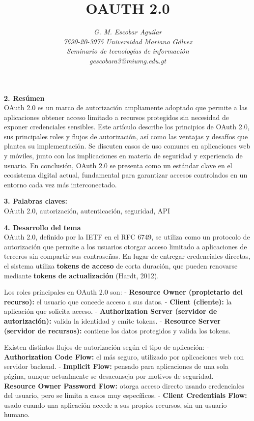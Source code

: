 \documentclass[12pt]{article}
\title{\textbf{\MakeUppercase{OAUTH 2.0}}}
\author{\textit{G. M. Escobar Aguilar}\\
\textit{7690-20-3975 Universidad Mariano Gálvez}\\
\textit{Seminario de tecnologías de información}\\
\textit{gescobara3@miumg.edu.gt}}
\date{}
\begin{document}
\maketitle

\textbf{2. Resúmen}  
\\
OAuth 2.0 es un marco de autorización ampliamente adoptado que permite a las aplicaciones obtener acceso limitado a recursos protegidos sin necesidad de exponer credenciales sensibles. Este artículo describe los principios de OAuth 2.0, sus principales roles y flujos de autorización, así como las ventajas y desafíos que plantea su implementación. Se discuten casos de uso comunes en aplicaciones web y móviles, junto con las implicaciones en materia de seguridad y experiencia de usuario. En conclusión, OAuth 2.0 se presenta como un estándar clave en el ecosistema digital actual, fundamental para garantizar accesos controlados en un entorno cada vez más interconectado.

\textbf{3. Palabras claves:}  
\\
OAuth 2.0, autorización, autenticación, seguridad, API

\textbf{4. Desarrollo del tema}  
\\
OAuth 2.0, definido por la IETF en el RFC 6749, se utiliza como un protocolo de autorización que permite a los usuarios otorgar acceso limitado a aplicaciones de terceros sin compartir sus contraseñas. En lugar de entregar credenciales directas, el sistema utiliza \textbf{tokens de acceso} de corta duración, que pueden renovarse mediante \textbf{tokens de actualización} (Hardt, 2012).  

Los roles principales en OAuth 2.0 son:  
- \textbf{Resource Owner (propietario del recurso):} el usuario que concede acceso a sus datos.  
- \textbf{Client (cliente):} la aplicación que solicita acceso.  
- \textbf{Authorization Server (servidor de autorización):} valida la identidad y emite tokens.  
- \textbf{Resource Server (servidor de recursos):} contiene los datos protegidos y valida los tokens.  

Existen distintos flujos de autorización según el tipo de aplicación:  
- \textbf{Authorization Code Flow:} el más seguro, utilizado por aplicaciones web con servidor backend.  
- \textbf{Implicit Flow:} pensado para aplicaciones de una sola página, aunque actualmente se desaconseja por motivos de seguridad.  
- \textbf{Resource Owner Password Flow:} otorga acceso directo usando credenciales del usuario, pero se limita a casos muy específicos.  
- \textbf{Client Credentials Flow:} usado cuando una aplicación accede a sus propios recursos, sin un usuario humano.  
\end{document}
